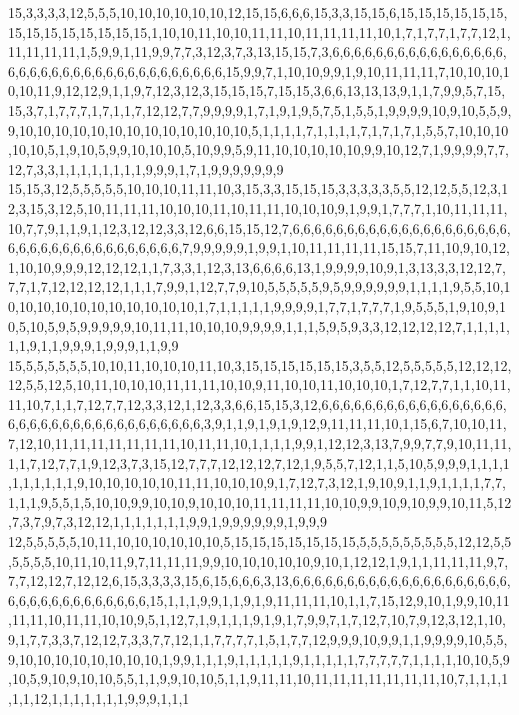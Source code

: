 15,3,3,3,3,12,5,5,5,10,10,10,10,10,10,12,15,15,6,6,6,15,3,3,15,15,6,15,15,15,15,15,15,15,15,15,15,15,15,15,15,1,10,10,11,10,10,11,11,10,11,11,11,11,10,1,7,1,7,7,1,7,7,12,1,11,11,11,11,1,5,9,9,1,11,9,9,7,7,3,12,3,7,3,13,15,15,7,3,6,6,6,6,6,6,6,6,6,6,6,6,6,6,6,6,6,6,6,6,6,6,6,6,6,6,6,6,6,6,6,6,6,6,6,6,15,9,9,7,1,10,10,9,9,1,9,10,11,11,11,7,10,10,10,10,10,11,9,12,12,9,1,1,9,7,12,3,12,3,15,15,15,7,15,15,3,6,6,13,13,13,9,1,1,7,9,9,5,7,15,15,3,7,1,7,7,7,1,7,1,1,7,12,12,7,7,9,9,9,9,1,7,1,9,1,9,5,7,5,1,5,5,1,9,9,9,9,10,9,10,5,5,9,9,10,10,10,10,10,10,10,10,10,10,10,10,10,5,1,1,1,1,7,1,1,1,1,7,1,7,1,7,1,5,5,7,10,10,10,10,10,5,1,9,10,5,9,9,10,10,10,5,10,9,9,5,9,11,10,10,10,10,10,9,9,10,12,7,1,9,9,9,9,7,7,12,7,3,3,1,1,1,1,1,1,1,1,9,9,9,1,7,1,9,9,9,9,9,9,9
15,15,3,12,5,5,5,5,5,10,10,10,11,11,10,3,15,3,3,15,15,15,3,3,3,3,3,5,5,12,12,5,5,12,3,12,3,15,3,12,5,10,11,11,11,10,10,10,11,10,11,11,10,10,10,9,1,9,9,1,7,7,7,1,10,11,11,11,10,7,7,9,1,1,9,1,12,3,12,12,3,3,12,6,6,15,15,12,7,6,6,6,6,6,6,6,6,6,6,6,6,6,6,6,6,6,6,6,6,6,6,6,6,6,6,6,6,6,6,6,6,6,6,6,6,7,9,9,9,9,9,1,9,9,1,10,11,11,11,11,15,15,7,11,10,9,10,12,1,10,10,9,9,9,12,12,12,1,1,7,3,3,1,12,3,13,6,6,6,6,13,1,9,9,9,9,10,9,1,3,13,3,3,12,12,7,7,7,1,7,12,12,12,12,1,1,1,7,9,9,1,12,7,7,9,10,5,5,5,5,5,9,5,9,9,9,9,9,9,1,1,1,1,9,5,5,10,10,10,10,10,10,10,10,10,10,10,10,1,7,1,1,1,1,1,9,9,9,9,1,7,7,1,7,7,7,1,9,5,5,5,1,9,10,9,10,5,10,5,9,5,9,9,9,9,9,10,11,11,10,10,10,9,9,9,9,1,1,1,5,9,5,9,3,3,12,12,12,12,7,1,1,1,1,1,1,9,1,1,9,9,9,1,9,9,9,1,1,9,9
15,5,5,5,5,5,5,10,10,11,10,10,10,11,10,3,15,15,15,15,15,15,3,5,5,12,5,5,5,5,5,12,12,12,12,5,5,12,5,10,11,10,10,10,11,11,11,10,10,9,11,10,10,11,10,10,10,1,7,12,7,7,1,1,10,11,11,10,7,1,1,7,12,7,7,12,3,3,12,1,12,3,3,6,6,15,15,3,12,6,6,6,6,6,6,6,6,6,6,6,6,6,6,6,6,6,6,6,6,6,6,6,6,6,6,6,6,6,6,6,6,6,6,6,3,9,1,1,9,1,9,1,9,12,9,11,11,11,10,1,15,6,7,10,10,11,7,12,10,11,11,11,11,11,11,11,10,11,11,10,1,1,1,1,9,9,1,12,12,3,13,7,9,9,7,7,9,10,11,11,1,1,7,12,7,7,1,9,12,3,7,3,15,12,7,7,7,12,12,12,7,12,1,9,5,5,7,12,1,1,5,10,5,9,9,9,1,1,1,1,1,1,1,1,1,1,9,10,10,10,10,10,11,11,10,10,10,9,1,7,12,7,3,12,1,9,10,9,1,1,9,1,1,1,1,7,7,1,1,1,9,5,5,1,5,10,10,9,9,10,10,9,10,10,10,11,11,11,11,10,10,9,9,10,9,10,9,9,10,11,5,12,7,3,7,9,7,3,12,12,1,1,1,1,1,1,1,9,9,1,9,9,9,9,9,9,1,9,9,9
12,5,5,5,5,5,10,11,10,10,10,10,10,10,5,15,15,15,15,15,15,15,5,5,5,5,5,5,5,5,5,12,12,5,5,5,5,5,5,10,11,10,11,9,7,11,11,11,9,9,10,10,10,10,10,9,10,1,12,12,1,9,1,1,11,11,11,9,7,7,7,12,12,7,12,12,6,15,3,3,3,3,15,6,15,6,6,6,3,13,6,6,6,6,6,6,6,6,6,6,6,6,6,6,6,6,6,6,6,6,6,6,6,6,6,6,6,6,6,6,6,6,6,15,1,1,1,9,9,1,1,9,1,9,11,11,11,10,1,1,7,15,12,9,10,1,9,9,10,11,11,11,10,11,11,10,10,9,5,1,12,7,1,9,1,1,1,9,1,9,1,7,9,9,7,1,7,12,7,10,7,9,12,3,12,1,10,9,1,7,7,3,3,7,12,12,7,3,3,7,7,12,1,1,7,7,7,7,1,5,1,7,7,12,9,9,9,10,9,9,1,1,9,9,9,9,10,5,5,9,10,10,10,10,10,10,10,10,1,9,9,1,1,1,9,1,1,1,1,1,9,1,1,1,1,1,7,7,7,7,7,1,1,1,1,10,10,5,9,10,5,9,10,9,10,10,5,5,1,1,9,9,10,10,5,1,1,9,11,11,10,11,11,11,11,11,11,11,10,7,1,1,1,1,1,1,12,1,1,1,1,1,1,1,9,9,9,1,1,1
